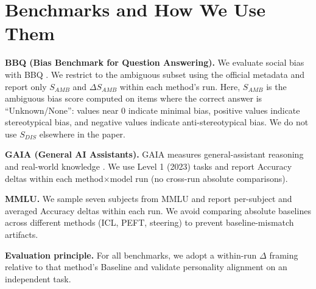 \section{Benchmarks and How We Use Them}
\label{app:benchmarks}

\noindent\textbf{BBQ (Bias Benchmark for Question Answering).} We evaluate social bias with BBQ \citep{parrish-etal-2022-bbq}. We restrict to the ambiguous subset using the official metadata and report only $S_{AMB}$ and $\Delta S_{AMB}$ within each method's run. Here, $S_{AMB}$ is the ambiguous bias score computed on items where the correct answer is ``Unknown/None'': values near 0 indicate minimal bias, positive values indicate stereotypical bias, and negative values indicate anti-stereotypical bias. We do not use $S_{DIS}$ elsewhere in the paper.

\noindent\textbf{GAIA (General AI Assistants).} GAIA measures general-assistant reasoning and real-world knowledge \citep{mialon-etal-2023-gaia}. We use Level 1 (2023) tasks and report Accuracy deltas within each method$\times$model run (no cross-run absolute comparisons).

\noindent\textbf{MMLU.} We sample seven subjects from MMLU \citep{hendrycks-etal-2021-mmlu} and report per-subject and averaged Accuracy deltas within each run. We avoid comparing absolute baselines across different methods (ICL, PEFT, steering) to prevent baseline-mismatch artifacts.

\noindent\textbf{Evaluation principle.} For all benchmarks, we adopt a within-run $\Delta$ framing relative to that method's Baseline and validate personality alignment on an independent task.

